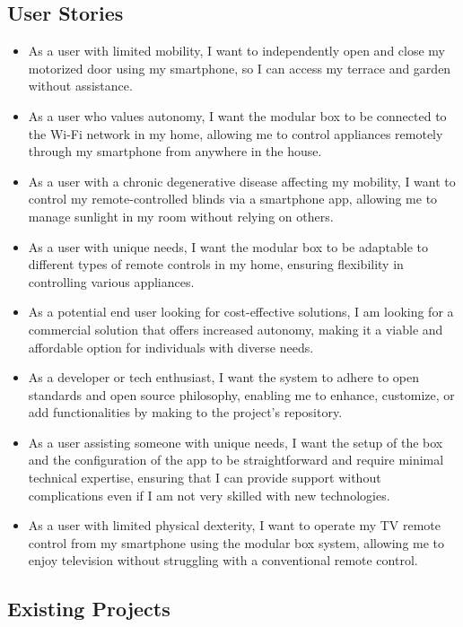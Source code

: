 \subsection{User Stories}

\begin{itemize}
    \item As a user with limited mobility, I want to independently open and close my motorized door using my smartphone, so I can access my terrace and garden without assistance.
    \item As a user who values autonomy, I want the modular box to be connected to the Wi-Fi network in my home, allowing me to control appliances remotely through my smartphone from anywhere in the house.
    \item As a user with a chronic degenerative disease affecting my mobility, I want to control my remote-controlled blinds via a smartphone app, allowing me to manage sunlight in my room without relying on others.
    \item As a user with unique needs, I want the modular box to be adaptable to different types of remote controls in my home, ensuring flexibility in controlling various appliances.
    \item As a potential end user looking for cost-effective solutions, I am looking for a commercial solution that offers increased autonomy, making it a viable and affordable option for individuals with diverse needs.
    \item As a developer or tech enthusiast, I want the system to adhere to open standards and open source philosophy, enabling me to enhance, customize, or add functionalities by making  to the project's repository.
    \item As a user assisting someone with unique needs, I want the setup of the box and the configuration of the app to be straightforward and require minimal technical expertise, ensuring that I can provide support without complications even if I am not very skilled with new technologies.
    \item As a user with limited physical dexterity, I want to operate my TV remote control from my smartphone using the modular box system, allowing me to enjoy television without struggling with a conventional remote control.
\end{itemize}

\subsection{Existing Projects}

